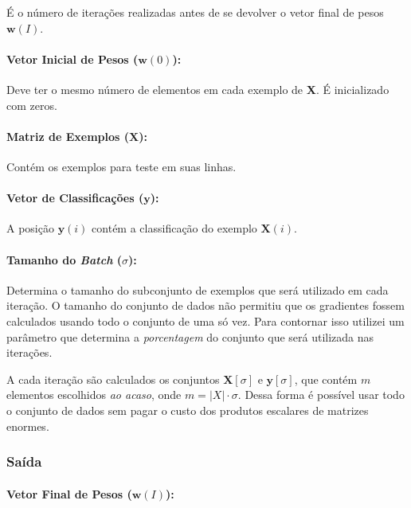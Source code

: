 \documentclass[a4paper, 12pt]{article}
\begin{document}
É o número de iterações realizadas antes de se devolver o vetor final de pesos
$\textbf{w}(I)$.

\paragraph{Vetor Inicial de Pesos ($\textbf{w}(0)$):}

Deve ter o mesmo número de elementos em cada exemplo de \textbf{X}.
É inicializado com zeros.

\paragraph{Matriz de Exemplos ($\textbf{X}$):}

Contém os exemplos para teste em suas linhas.

\paragraph{Vetor de Classificações ($\textbf{y}$):}

A posição $\textbf{y}(i)$ contém a classificação
do exemplo $\textbf{X}(i)$.

\paragraph{Tamanho do \textit{Batch} ($\sigma$):}

Determina o tamanho do subconjunto de exemplos que será utilizado em cada
iteração. O tamanho do conjunto de dados não permitiu que os gradientes
fossem calculados usando todo o conjunto de uma só vez. Para contornar
isso utilizei um parâmetro que determina a \textit{porcentagem} do
conjunto que será utilizada nas iterações.

A cada iteração são calculados os conjuntos $\textbf{X}[\sigma]$ e
$\textbf{y}[\sigma]$, que contém $m$  elementos escolhidos \textit{ao acaso},
onde $m = \left\vert{X}\right\vert \cdot \sigma$.  Dessa forma é possível usar
todo o conjunto de dados sem pagar o custo dos produtos escalares de matrizes
enormes.

\subsubsection{Saída}

\paragraph{Vetor Final de Pesos ($\textbf{w}(I)$):}
\end{document}
